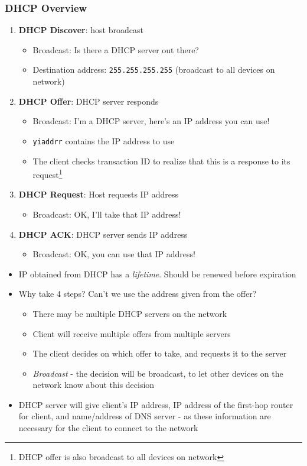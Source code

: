 \subsubsection{DHCP Overview}
\begin{enumerate}
	\item \textbf{DHCP Discover}: host broadcast
	\begin{itemize}
		\item Broadcast: Is there a DHCP server out there?
		\item Destination address: \texttt{255.255.255.255} (broadcast to all devices on network)
	\end{itemize}
	\item \textbf{DHCP Offer}: DHCP server responds
	\begin{itemize}
		\item Broadcast: I'm a DHCP server, here's an IP address you can use!
		\item \texttt{yiaddrr} contains the IP address to use
		\item The client checks transaction ID to realize that this is a response to its request\footnote{DHCP offer is also broadcast to all devices on network}
	\end{itemize}
	\item \textbf{DHCP Request}: Host requests IP address
	\begin{itemize}
		\item Broadcast: OK, I'll take that IP address!
	\end{itemize}
	\item \textbf{DHCP ACK}: DHCP server sends IP address
	\begin{itemize}
		\item Broadcast: OK, you can use that IP address!
	\end{itemize}
\end{enumerate}
\begin{itemize}
	\item IP obtained from DHCP has a \textit{lifetime}. Should be renewed before expiration
	\item Why take 4 steps? Can't we use the address given from the offer?
	\begin{itemize}
		\item There may be multiple DHCP servers on the network
		\item Client will receive multiple offers from multiple servers
		\item The client decides on which offer to take, and requests it to the server
		\item \textit{Broadcast} - the decision will be broadcast, to let other devices on the network know about this decision
	\end{itemize}
	\item DHCP server will give client's IP address, IP address of the first-hop router for client, and name/address of DNS server - as these information are necessary for the client to connect to the network
\end{itemize}


